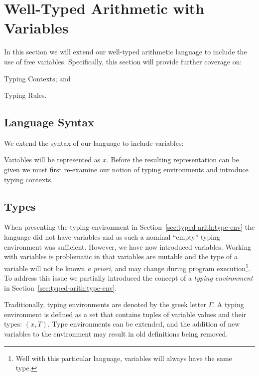 \section{Well-Typed Arithmetic with Variables}
\label{sec:typed-arith-var}

In this section we will extend our well-typed arithmetic language to include the use of free variables.
Specifically, this section will provide further coverage on:
\begin{compactitem}
  \item Typing Contexts; and
  \item Typing Rules.
\end{compactitem}

\subsection{Language Syntax}
\label{sec:typed-arith-var:syntax}

We extend the syntax of our language to include variables:

\begin{bnf}
\end{bnf}

\noindent
Variables will be represented as $x$.
Before the resulting \idris{} representation can be given we must first re-examine our notion of typing environments and introduce typing contexts.

\subsection{Types}
\label{sec:typed-arith-var:types}

When presenting the typing environment in Section~\ref{sec:typed-arith:type-env} the language did not have variables and as such a nominal ``empty'' typing environment was sufficient.
However, we have now introduced variables.
Working with variables is problematic in that variables are  mutable and the type of a variable will not be known \emph{a priori}, and may change during program execution\footnote{Well with this particular language, variables will always have the same type.}.
To address this issue we partially introduced the concept of a \emph{typing environment} in Section~\ref{sec:typed-arith:type-env}.

Traditionally, typing environments are denoted by the greek letter $\Gamma$.
A typing environment is defined as a set that contains tuples of variable values and their types: $(x,T)$.
Type environments can be extended, and the addition of new variables to the environment may result in old definitions being removed.

